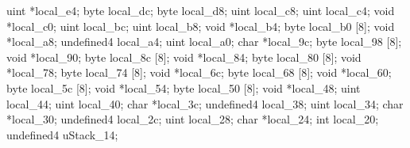 \documentclass[
]{article}
\newenvironment{Shaded}{}{}
\newcommand{\DataTypeTok}[1]{\textcolor[rgb]{0.56,0.13,0.00}{#1}}
\newcommand{\DecValTok}[1]{\textcolor[rgb]{0.25,0.63,0.44}{#1}}
\newcommand{\NormalTok}[1]{#1}
\newcommand{\OperatorTok}[1]{\textcolor[rgb]{0.40,0.40,0.40}{#1}}
\begin{document}
\begin{Shaded}
\begin{Highlighting}[]
\NormalTok{  uint }\OperatorTok{*}\NormalTok{local\_e4}\OperatorTok{;}
\NormalTok{  byte local\_dc}\OperatorTok{;}
\NormalTok{  byte local\_d8}\OperatorTok{;}
\NormalTok{  uint local\_c8}\OperatorTok{;}
\NormalTok{  uint local\_c4}\OperatorTok{;}
  \DataTypeTok{void} \OperatorTok{*}\NormalTok{local\_c0}\OperatorTok{;}
\NormalTok{  uint local\_bc}\OperatorTok{;}
\NormalTok{  uint local\_b8}\OperatorTok{;}
  \DataTypeTok{void} \OperatorTok{*}\NormalTok{local\_b4}\OperatorTok{;}
\NormalTok{  byte local\_b0 }\OperatorTok{[}\DecValTok{8}\OperatorTok{];}
  \DataTypeTok{void} \OperatorTok{*}\NormalTok{local\_a8}\OperatorTok{;}
\NormalTok{  undefined4 local\_a4}\OperatorTok{;}
\NormalTok{  uint local\_a0}\OperatorTok{;}
  \DataTypeTok{char} \OperatorTok{*}\NormalTok{local\_9c}\OperatorTok{;}
\NormalTok{  byte local\_98 }\OperatorTok{[}\DecValTok{8}\OperatorTok{];}
  \DataTypeTok{void} \OperatorTok{*}\NormalTok{local\_90}\OperatorTok{;}
\NormalTok{  byte local\_8c }\OperatorTok{[}\DecValTok{8}\OperatorTok{];}
  \DataTypeTok{void} \OperatorTok{*}\NormalTok{local\_84}\OperatorTok{;}
\NormalTok{  byte local\_80 }\OperatorTok{[}\DecValTok{8}\OperatorTok{];}
  \DataTypeTok{void} \OperatorTok{*}\NormalTok{local\_78}\OperatorTok{;}
\NormalTok{  byte local\_74 }\OperatorTok{[}\DecValTok{8}\OperatorTok{];}
  \DataTypeTok{void} \OperatorTok{*}\NormalTok{local\_6c}\OperatorTok{;}
\NormalTok{  byte local\_68 }\OperatorTok{[}\DecValTok{8}\OperatorTok{];}
  \DataTypeTok{void} \OperatorTok{*}\NormalTok{local\_60}\OperatorTok{;}
\NormalTok{  byte local\_5c }\OperatorTok{[}\DecValTok{8}\OperatorTok{];}
  \DataTypeTok{void} \OperatorTok{*}\NormalTok{local\_54}\OperatorTok{;}
\NormalTok{  byte local\_50 }\OperatorTok{[}\DecValTok{8}\OperatorTok{];}
  \DataTypeTok{void} \OperatorTok{*}\NormalTok{local\_48}\OperatorTok{;}
\NormalTok{  uint local\_44}\OperatorTok{;}
\NormalTok{  uint local\_40}\OperatorTok{;}
  \DataTypeTok{char} \OperatorTok{*}\NormalTok{local\_3c}\OperatorTok{;}
\NormalTok{  undefined4 local\_38}\OperatorTok{;}
\NormalTok{  uint local\_34}\OperatorTok{;}
  \DataTypeTok{char} \OperatorTok{*}\NormalTok{local\_30}\OperatorTok{;}
\NormalTok{  undefined4 local\_2c}\OperatorTok{;}
\NormalTok{  uint local\_28}\OperatorTok{;}
  \DataTypeTok{char} \OperatorTok{*}\NormalTok{local\_24}\OperatorTok{;}
  \DataTypeTok{int}\NormalTok{ local\_20}\OperatorTok{;}
\NormalTok{  undefined4 uStack\_14}\OperatorTok{;}


\end{Highlighting}
\end{Shaded}
\end{document}
